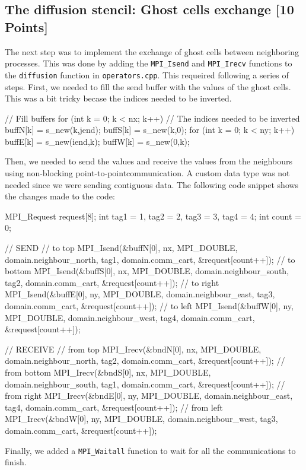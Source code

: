 \documentclass[unicode,11pt,a4paper,oneside,numbers=endperiod,openany]{scrartcl}
\begin{document}
\subsection{The diffusion stencil: Ghost cells exchange [10 Points]}
The next step was to implement the exchange of ghost cells between neighboring
processes. This was done by adding the \texttt{MPI\_Isend} and \texttt{MPI\_Irecv} functions to the
\texttt{diffusion} function in \texttt{operators.cpp}. 
This requeired following a series of steps.
First, we needed to fill the send buffer with the values of the ghost cells.
This was a bit tricky becase the indices needed to be inverted. 
\begin{cppverbatim}
// Fill buffers
for (int k = 0; k < nx; k++)
{
    // The indices needed to be inverted
    buffN[k] = s_new(k,jend);
    buffS[k] = s_new(k,0);
}
for (int k = 0; k < ny; k++)
{
    buffE[k] = s_new(iend,k);
    buffW[k] = s_new(0,k);
}
\end{cppverbatim}
Then, we needed to send the values and receive the values from the neighbours
using non-blocking point-to-pointcommunication. A custom data type was not
needed since we were sending contiguous data. The following code snippet shows
the changes made to the code:
\begin{cppverbatim}
MPI_Request request[8];
int tag1 = 1, tag2 = 2, tag3 = 3, tag4 = 4;
int count = 0;
    
// SEND
//  to top
MPI_Isend(&buffN[0], nx, MPI_DOUBLE, domain.neighbour_north, tag1, domain.comm_cart, &request[count++]);
//  to bottom
MPI_Isend(&buffS[0], nx, MPI_DOUBLE, domain.neighbour_south, tag2, domain.comm_cart, &request[count++]);
//  to right
MPI_Isend(&buffE[0], ny, MPI_DOUBLE, domain.neighbour_east, tag3, domain.comm_cart, &request[count++]);
//  to left
MPI_Isend(&buffW[0], ny, MPI_DOUBLE, domain.neighbour_west, tag4, domain.comm_cart, &request[count++]);

// RECEIVE
// from top
MPI_Irecv(&bndN[0], nx, MPI_DOUBLE, domain.neighbour_north, tag2, domain.comm_cart, &request[count++]);
// from bottom
MPI_Irecv(&bndS[0], nx, MPI_DOUBLE, domain.neighbour_south, tag1, domain.comm_cart, &request[count++]);
// from right
MPI_Irecv(&bndE[0], ny, MPI_DOUBLE, domain.neighbour_east, tag4, domain.comm_cart, &request[count++]);
// from left
MPI_Irecv(&bndW[0], ny, MPI_DOUBLE, domain.neighbour_west, tag3, domain.comm_cart, &request[count++]);
\end{cppverbatim}
Finally, we added a \texttt{MPI\_Waitall} function to wait for all the communications to finish.
\end{document}
